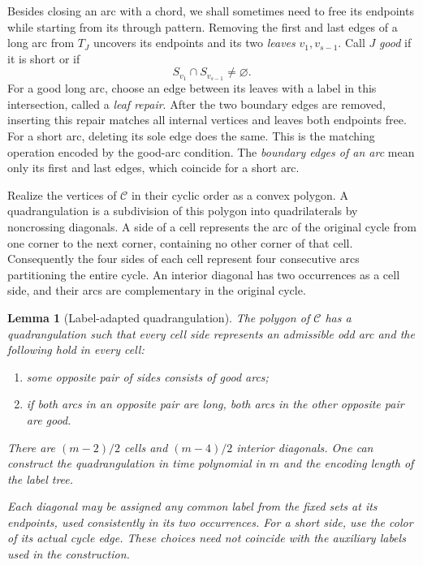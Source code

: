 \documentclass[11pt]{article}
\newtheorem{lemma}[theorem]{Lemma}
\theoremstyle{definition}
\theoremstyle{remark}
\numberwithin{equation}{section}
\begin{document}
Besides closing an arc with a chord, we shall sometimes need to free
its endpoints while starting from its through pattern. Removing the
first and last edges of a long arc from $T_J$ uncovers its endpoints
and its two \emph{leaves} $v_1,v_{s-1}$. Call $J$ \emph{good} if it is
short or if
\[
 S_{v_1}\cap S_{v_{s-1}}\ne\varnothing.
\]
For a good long arc, choose an edge between its leaves with a label in
this intersection, called a \emph{leaf repair}. After the two boundary
edges are removed, inserting this repair matches all internal vertices
and leaves both endpoints free. For a short arc, deleting its sole
edge does the same. This is the matching operation encoded by the
good-arc condition. The \emph{boundary edges of an arc} mean only its
first and last edges, which coincide for a short arc.

Realize the vertices of $\mathcal C$ in their cyclic order as a convex
polygon.  A quadrangulation is a subdivision of this polygon into
quadrilaterals by noncrossing diagonals.  A side of a cell represents the
arc of the original cycle from one corner to the next corner, containing
no other corner of that cell.  Consequently the four sides of each cell
represent four consecutive arcs partitioning the entire cycle.  An
interior diagonal has two occurrences as a cell side, and their arcs
are complementary in the original cycle.

\begin{lemma}[Label-adapted quadrangulation]
\label{lem:quadrangulation}
The polygon of $\mathcal C$ has a quadrangulation such that every cell
side represents an admissible odd arc and the following hold in every
cell:
\begin{enumerate}[label=\textup{(\roman*)}]
 \item some opposite pair of sides consists of good arcs;
 \item if both arcs in an opposite pair are long, both arcs in the
 other opposite pair are good.
\end{enumerate}
There are $(m-2)/2$ cells and $(m-4)/2$ interior diagonals.  One can
construct the quadrangulation in time polynomial in $m$ and the encoding
length of the label tree.

Each diagonal may be assigned any common label from the fixed sets at
its endpoints, used consistently in its two occurrences.  For a short
side, use the color of its actual cycle edge.  These choices need not
coincide with the auxiliary labels used in the construction.
\end{lemma}
\end{document}
